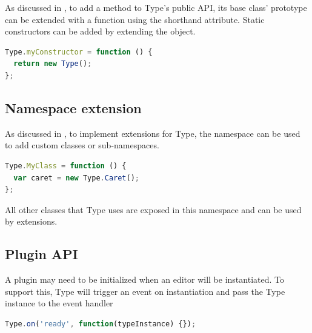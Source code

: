 As discussed in , to add a method to Type's public API, its base class' prototype can be extended with a function using the  shorthand attribute. Static constructors can be added by extending the   object.

\begin{lstlisting}[language=JavaScript, caption=Example custom static constructor, label=lst:example_static_constructor_extension]
Type.myConstructor = function () {
  return new Type();
};
\end{lstlisting}

\subsection{Namespace extension}

As discussed in , to implement extensions for Type, the  namespace can be used to add custom classes or sub-namespaces.

\begin{lstlisting}[language=JavaScript, caption=Example Type namespace extension and usage of a built-in class., label=lst:namespace_extension_example]
Type.MyClass = function () {
  var caret = new Type.Caret();
};
\end{lstlisting}


\noindent All other classes that Type uses are exposed in this namespace and can be used by extensions.%

\subsection{Plugin API}

A plugin may need to be initialized when an editor will be instantiated. To support this, Type will trigger an event on instantiation and pass the Type instance to the event handler

\begin{lstlisting}[language=JavaScript, caption=Example event handler for a Type instantiation, label=lst:instantiation_even_handler_example]
Type.on('ready', function(typeInstance) {});
\end{lstlisting}

